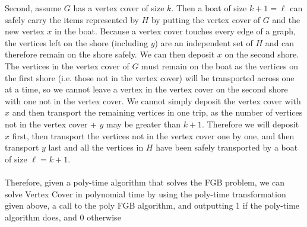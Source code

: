 \documentclass[letterpaper,notitlepage,twoside]{article}
\begin{document}
Second, assume $G$ has a vertex cover of size $k$. Then a boat of size $k+1=\ell$ can safely carry the items represented by $H$ by putting the vertex cover of $G$ and the new vertex $x$ in the boat. Because a vertex cover touches every edge of a graph, the vertices left on the shore (including $y$) are an independent set of $H$ and can therefore remain on the shore safely. We can then deposit $x$ on the second shore. The vertices in the vertex cover of $G$ must remain on the boat as the vertices on the first shore (i.e. those not in the vertex cover) will be transported across one at a time, so we cannot leave a vertex in the vertex cover on the second shore with one not in the vertex cover. We cannot simply deposit the vertex cover with $x$ and then transport the remaining vertices in one trip, as the number of vertices not in the vertex cover + $y$ may be greater than $k+1$. Therefore we will deposit $x$ first, then transport the vertices not in the vertex cover one by one, and then transport $y$ last and all the vertices in $H$ have been safely transported by a boat of size $\ell = k+1$.\\\\
Therefore, given a poly-time algorithm that solves the FGB problem, we can solve Vertex Cover in polynomial time by using the poly-time transformation given above, a call to the poly FGB algorithm, and outputting 1 if the poly-time algorithm does, and 0 otherwise
\end{document}
